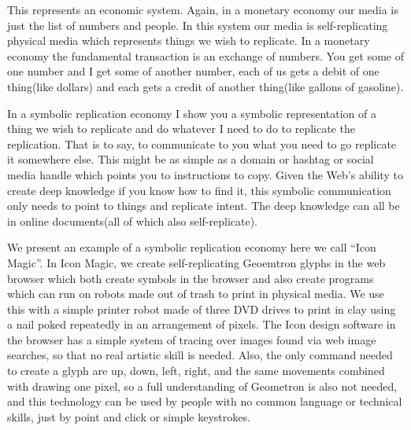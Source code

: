 This represents an economic system. Again, in a monetary economy our
media is just the list of numbers and people. In this system our media
is self-replicating physical media which represents things we wish to
replicate. In a monetary economy the fundamental transaction is an
exchange of numbers. You get some of one number and I get some of
another number, each of us gets a debit of one thing(like dollars) and
each gets a credit of another thing(like gallons of gasoline).

In a symbolic replication economy I show you a symbolic representation
of a thing we wish to replicate and do whatever I need to do to
replicate the replication. That is to say, to communicate to you what
you need to go replicate it somewhere else. This might be as simple as a
domain or hashtag or social media handle which points you to
instructions to copy. Given the Web's ability to create deep knowledge
if you know how to find it, this symbolic communication only needs to
point to things and replicate intent. The deep knowledge can all be in
online documents(all of which also self-replicate).

We present an example of a symbolic replication economy here we call
``Icon Magic''. In Icon Magic, we create self-replicating Geoemtron
glyphs in the web browser which both create symbols in the browser and
also create programs which can run on robots made out of trash to print
in physical media. We use this with a simple printer robot made of three
DVD drives to print in clay using a nail poked repeatedly in an
arrangement of pixels. The Icon design software in the browser has a
simple system of tracing over images found via web image searches, so
that no real artistic skill is needed. Also, the only command needed to
create a glyph are up, down, left, right, and the same movements
combined with drawing one pixel, so a full understanding of Geometron is
also not needed, and this technology can be used by people with no
common language or technical skills, just by point and click or simple
keystrokes.

